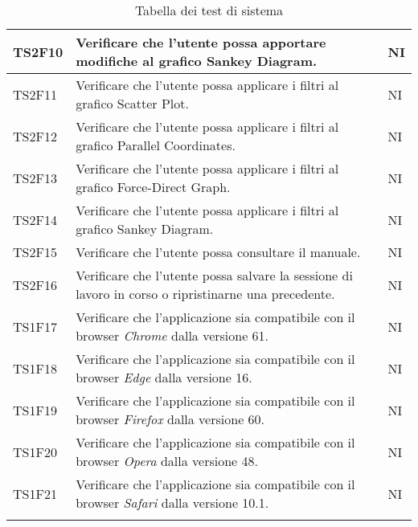 \begin{center}
\begin{longtable}{|p{1.5cm}|p{11cm}|p{1cm}|}
            TS2F10 & Verificare che l’utente possa apportare modifiche al grafico Sankey Diagram. & NI\\ \hline
            \rowcolor[HTML]{C0C0C0}
            TS2F11 & Verificare che l’utente possa applicare i filtri al grafico Scatter Plot. & NI\\ \hline
            \rowcolor[HTML]{EFEFEF}
            TS2F12 & Verificare che l’utente possa applicare i filtri al grafico Parallel Coordinates. & NI\\ \hline
            \rowcolor[HTML]{C0C0C0}
            TS2F13 & Verificare che l’utente possa applicare i filtri al grafico Force-Direct Graph. & NI\\ \hline
            \rowcolor[HTML]{EFEFEF}
            TS2F14 & Verificare che l’utente possa applicare i filtri al grafico Sankey Diagram. & NI\\ \hline
            \rowcolor[HTML]{C0C0C0}
            TS2F15 & Verificare che l’utente possa consultare il manuale. & NI\\ \hline
            \rowcolor[HTML]{EFEFEF}
            TS2F16 & Verificare che l’utente possa salvare la sessione di lavoro in corso o ripristinarne una precedente. & NI\\ \hline
            \rowcolor[HTML]{C0C0C0}
            TS1F17 & Verificare che l'applicazione sia compatibile con il browser \textit{Chrome} dalla versione 61. & NI\\ \hline
            \rowcolor[HTML]{EFEFEF}
            TS1F18 & Verificare che l'applicazione sia compatibile con il browser \textit{Edge} dalla versione 16. & NI\\ \hline
            \rowcolor[HTML]{C0C0C0}
            TS1F19 & Verificare che l'applicazione sia compatibile con il browser \textit{Firefox} dalla versione 60. & NI\\ \hline
            \rowcolor[HTML]{EFEFEF}
            TS1F20 & Verificare che l'applicazione sia compatibile con il browser \textit{Opera} dalla versione 48. & NI\\ \hline
            \rowcolor[HTML]{C0C0C0}
            TS1F21 & Verificare che l'applicazione sia compatibile con il browser \textit{Safari} dalla versione 10.1. & NI\\ \hline
            \caption{Tabella dei test di sistema}
        \end{longtable}
    \end{center}

